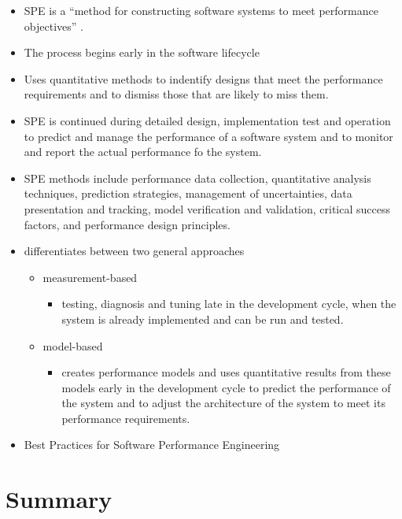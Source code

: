 \begin{itemize}
	\item \ac{SPE} is a ``method for constructing software systems to meet performance objectives'' \citep{Smith:1990aa}.
	\item The process begins early in the software lifecycle
	\item Uses quantitative methods to indentify designs that meet the performance requirements and to dismiss those that are likely to miss them.
	\item \ac{SPE} is continued during detailed design, implementation test and operation to predict and manage the performance of a software system and to monitor and report the actual performance fo the system.
	\item \ac{SPE} methods include performance data collection, quantitative analysis techniques, prediction strategies, management of uncertainties, data presentation and tracking, model verification and validation, critical success factors, and performance design principles. 
	\item \citep{Woodside:2007aa} differentiates between two general approaches
	\begin{itemize}
		\item measurement-based
		\begin{itemize}
			\item testing, diagnosis and tuning late in the development cycle, when the system is already implemented and can be run and tested.
		\end{itemize}
		\item model-based
		\begin{itemize}
			\item creates performance models and uses quantitative results from these models early in the development cycle to predict the performance of the system and to adjust the architecture of the system to meet its performance requirements.
		\end{itemize}
	\end{itemize}
\end{itemize}

\begin{itemize}
	\item Best Practices for Software Performance Engineering \citep{Smith:2003aa}
\end{itemize}

\section{Summary}

